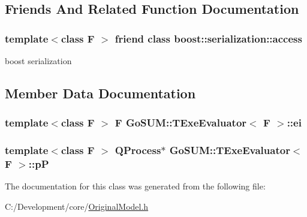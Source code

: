 \subsection{Friends And Related Function Documentation}
\hypertarget{class_go_s_u_m_1_1_t_exe_evaluator_ac98d07dd8f7b70e16ccb9a01abf56b9c}{
\subsubsection[{boost\-::serialization\-::access}]{\setlength{\rightskip}{0pt plus 5cm}template$<$class F $>$ friend class boost\-::serialization\-::access\hspace{0.3cm}{\ttfamily [friend]}}}\label{class_go_s_u_m_1_1_t_exe_evaluator_ac98d07dd8f7b70e16ccb9a01abf56b9c}


boost serialization 



\subsection{Member Data Documentation}
\hypertarget{class_go_s_u_m_1_1_t_exe_evaluator_a64bc943e457b942367662298bca60211}{
\subsubsection[{ei}]{\setlength{\rightskip}{0pt plus 5cm}template$<$class F $>$ F {\bf Go\-S\-U\-M\-::\-T\-Exe\-Evaluator}$<$ F $>$\-::ei\hspace{0.3cm}{\ttfamily [private]}}}\label{class_go_s_u_m_1_1_t_exe_evaluator_a64bc943e457b942367662298bca60211}
\hypertarget{class_go_s_u_m_1_1_t_exe_evaluator_a660bd62e713f8cdaf329e4dafad6b740}{
\subsubsection[{p\-P}]{\setlength{\rightskip}{0pt plus 5cm}template$<$class F $>$ Q\-Process$\ast$ {\bf Go\-S\-U\-M\-::\-T\-Exe\-Evaluator}$<$ F $>$\-::p\-P\hspace{0.3cm}{\ttfamily [private]}}}\label{class_go_s_u_m_1_1_t_exe_evaluator_a660bd62e713f8cdaf329e4dafad6b740}


The documentation for this class was generated from the following file\-:\begin{DoxyCompactItemize}
\item 
C\-:/\-Development/core/\hyperlink{_original_model_8h}{Original\-Model.\-h}\end{DoxyCompactItemize}
